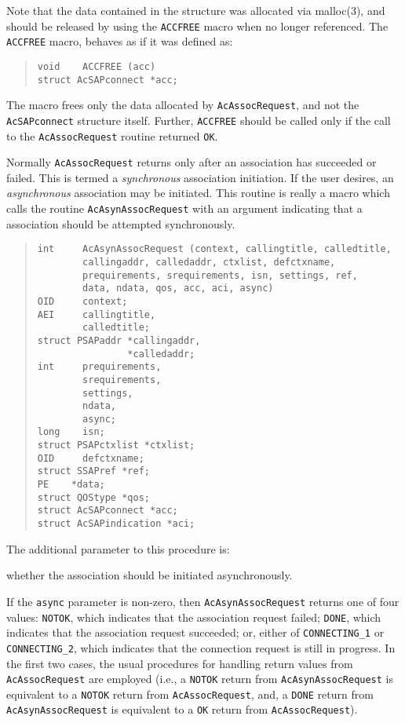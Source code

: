 Note that the data contained in the structure was allocated via \man malloc(3),
and should be released by using the \verb"ACCFREE" macro when no longer
referenced.
The \verb"ACCFREE" macro,
behaves as if it was defined as:\label{ACCFREE}
\begin{quote}\small\begin{verbatim}
void    ACCFREE (acc)
struct AcSAPconnect *acc;
\end{verbatim}\end{quote}
The macro frees only the data allocated by \verb"AcAssocRequest",
and not the \verb"AcSAPconnect" structure itself.
Further,
\verb"ACCFREE" should be called only if the call to the \verb"AcAssocRequest"
routine returned \verb"OK".

Normally \verb"AcAssocRequest" returns only after an association has succeeded
or failed.
This is termed a {\em synchronous\/} association initiation.
If the user desires, an {\em asynchronous\/} association may be initiated.
This routine is really a macro which calls the routine
\verb"AcAsynAssocRequest" with an argument indicating that a association should
be attempted synchronously.
\begin{quote}\small\begin{verbatim}
int     AcAsynAssocRequest (context, callingtitle, calledtitle,
        callingaddr, calledaddr, ctxlist, defctxname,
        prequirements, srequirements, isn, settings, ref,
        data, ndata, qos, acc, aci, async)
OID     context;
AEI     callingtitle,
        calledtitle;
struct PSAPaddr *callingaddr,
                *calledaddr;
int     prequirements,        
        srequirements,
        settings,
        ndata,
        async;
long    isn;
struct PSAPctxlist *ctxlist;
OID     defctxname;
struct SSAPref *ref;
PE    *data;
struct QOStype *qos;
struct AcSAPconnect *acc;
struct AcSAPindication *aci;
\end{verbatim}\end{quote}
The additional parameter to this procedure is:
\begin{describe}
\item[\verb"async":] whether the association should be initiated
asynchronously.
\end{describe}
If the \verb"async" parameter is non-zero,
then \verb"AcAsynAssocRequest" returns one of four values:
\verb"NOTOK", which indicates that the association request failed;
\verb"DONE", which indicates that the association request succeeded;
or, either of \verb"CONNECTING_1" or \verb"CONNECTING_2", which indicates that
the connection request is still in
progress.
In the first two cases,
the usual procedures for handling return values from \verb"AcAssocRequest" are
employed
(i.e., a \verb"NOTOK" return from \verb"AcAsynAssocRequest" is equivalent to a
\verb"NOTOK" return from \verb"AcAssocRequest", and,
a \verb"DONE" return from \verb"AcAsynAssocRequest" is equivalent to a
\verb"OK" return from \verb"AcAssocRequest").

